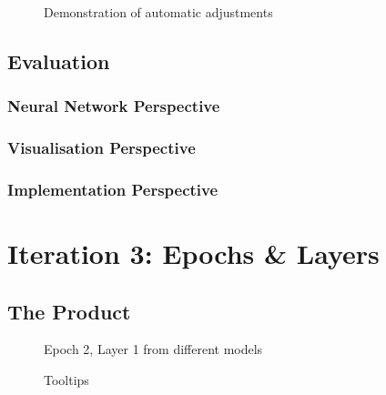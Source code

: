 \documentclass[a4paper,11pt,titlepage]{article}
\begin{document}
	\begin{figure}[H]
    			\caption{Demonstration of automatic adjustments}%
	\end{figure}	

	
	\subsection{Evaluation}	
		\subsubsection{Neural Network Perspective}
		\subsubsection{Visualisation Perspective}
		\subsubsection{Implementation Perspective}
					
\section{Iteration 3: Epochs \& Layers}
	\subsection{The Product}	
	
	\begin{figure}[H]
    			\caption{Epoch 2, Layer 1 from different models}%
	\end{figure}	

	\begin{figure}[H]
    			\caption{Tooltips}%
	\end{figure}	
	
\end{document}
